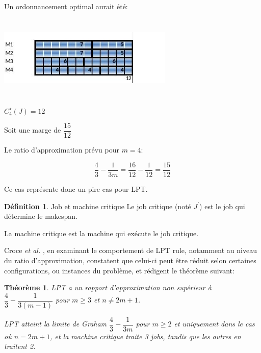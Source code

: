 \documentclass[a4paper,12pt]{report}
\theoremstyle{plain}				%
\newtheorem{theoreme}{Théorème}	%
\theoremstyle{definition}				%
\newtheorem{definition}{Définition} %
\begin{document}
\bigskip

\begin{minipage}{\linewidth}

\begin{flushleft}
Un ordonnancement optimal aurait été:
\end{flushleft}

{\centering
\includegraphics[width=8.334cm,height=4.034cm]{Biblio_PCmax_Rendu_exLPT_Rev2.jpg}
\par}


\begin{flushleft}
$C_4^{\star}(J)=12$
\end{flushleft}

\end{minipage}

Soit une marge de $\dfrac{15}{12}$

Le ratio d'approximation prévu pour $m=4$:

\[
  \dfrac{4}{3} - \dfrac{1}{3m}=\dfrac{16}{12} - \dfrac{1}{12}=\dfrac{15}{12}
\]

Ce cas représente donc un pire cas pour LPT.

\bigskip
\begin{definition}{Job et machine critique}
Le job critique (noté $J^\prime$) est le job qui détermine le
makespan.

La machine critique est la machine qui exécute le job critique.
\end{definition}

Croce \textit{et al.}
\cite{della2018longest}, en examinant le comportement de LPT rule,
notamment au niveau du ratio d'approximation, constatent que celui-ci
peut être réduit selon certaines configurations, ou instances du
problème, et rédigent le théorème suivant:

\begin{theoreme}
  LPT a un rapport d'approximation non supérieur à
  $\dfrac{4}{3} - \dfrac{1}{3(m-1)}$ pour $m \geq 3$ et $n \neq 2m+1$.

  LPT atteint la limite de Graham $\dfrac{4}{3} - \dfrac{1}{3m}$ pour
  $m \geq 2$ et uniquement dans le cas où $n=2m+1$, et la machine
  critique traite 3 jobs, tandis que les autres en traitent 2.

\end{theoreme}
\end{document}
